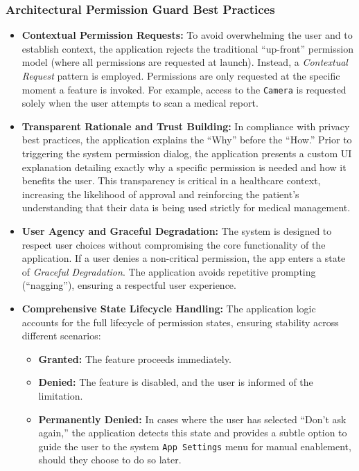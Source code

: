 \subsubsection{Architectural Permission Guard Best Practices}
\begin{itemize}
    \item \textbf{Contextual Permission Requests:} To avoid overwhelming the user and to establish context, the application rejects the traditional ``up-front'' permission model (where all permissions are requested at launch). Instead, a \textit{Contextual Request} pattern is employed. Permissions are only requested at the specific moment a feature is invoked. For example, access to the \texttt{Camera} is requested solely when the user attempts to scan a medical report.
    \item \textbf{Transparent Rationale and Trust Building:} In compliance with privacy best practices, the application explains the ``Why'' before the ``How.'' Prior to triggering the system permission dialog, the application presents a custom UI explanation detailing exactly why a specific permission is needed and how it benefits the user. This transparency is critical in a healthcare context, increasing the likelihood of approval and reinforcing the patient's understanding that their data is being used strictly for medical management.\cite{daydreamsoft2025permissions}
    \item \textbf{User Agency and Graceful Degradation:} The system is designed to respect user choices without compromising the core functionality of the application. If a user denies a non-critical permission, the app enters a state of \textit{Graceful Degradation}. The application avoids repetitive prompting (``nagging''), ensuring a respectful user experience. \cite{daydreamsoft2025permissions}
    \item \textbf{Comprehensive State Lifecycle Handling:} The application logic accounts for the full lifecycle of permission states, ensuring stability across different scenarios\cite{daydreamsoft2025permissions}\cite{boudanes2024permissions}:
          \begin{itemize}
              \item \textbf{Granted:} The feature proceeds immediately.
              \item \textbf{Denied:} The feature is disabled, and the user is informed of the limitation.
              \item \textbf{Permanently Denied:} In cases where the user has selected ``Don't ask again,'' the application detects this state and provides a subtle option to guide the user to the system \texttt{App Settings} menu for manual enablement, should they choose to do so later.
          \end{itemize}
\end{itemize}
